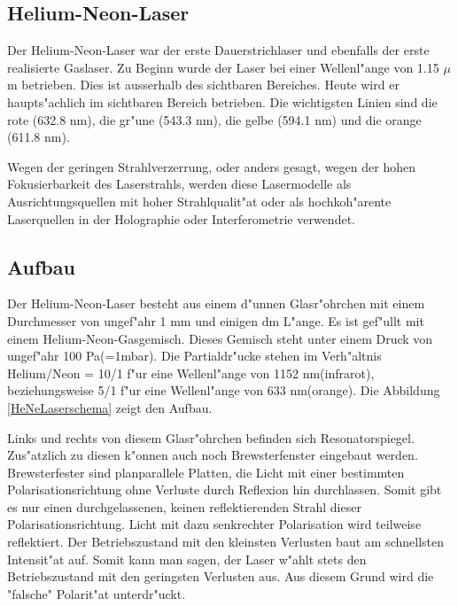 \begin{refsection}


\section{Helium-Neon-Laser
\label{He-Ne-Laser}}
Der Helium-Neon-Laser war der erste Dauerstrichlaser und ebenfalls der erste 
realisierte Gaslaser. Zu Beginn wurde der Laser bei einer Wellenl"ange von 
1.15 $\mu$m betrieben. Dies ist ausserhalb des sichtbaren Bereiches. Heute wird 
er haupts"achlich im sichtbaren Bereich betrieben. Die wichtigsten Linien sind 
die rote (632.8 nm), die gr"une (543.3 nm), die gelbe (594.1 nm) und die 
orange (611.8 nm).

Wegen der geringen Strahlverzerrung, oder anders gesagt, wegen der hohen
Fokusierbarkeit des Laserstrahls, werden diese Lasermodelle als
Ausrichtungsquellen mit hoher Strahlqualit"at oder als hochkoh"arente
Laserquellen in der Holographie oder Interferometrie verwendet.

\subsection{Aufbau}
\label{He-Ne-Laser Aufbau}
Der Helium-Neon-Laser besteht aus einem d"unnen Glasr"ohrchen mit einem 
Durchmesser von ungef"ahr 1 mm und einigen dm L"ange. Es ist gef"ullt mit 
einem Helium-Neon-Gasgemisch. 
Dieses Gemisch steht unter einem Druck von ungef"ahr 100 Pa(=1mbar).
Die Partialdr"ucke stehen im Verh"altnis Helium/Neon = 10/1 f"ur eine 
Wellenl"ange von 1152 nm(infrarot),
beziehungsweise 5/1 f"ur eine Wellenl"ange von 633 nm(orange).
Die Abbildung \ref{HeNeLaserschema} zeigt den Aufbau.

Links und rechts von diesem Glasr"ohrchen befinden sich Resonatorspiegel.
Zus"atzlich zu diesen k"onnen auch noch Brewsterfenster eingebaut werden.
Brewsterfester sind planparallele Platten, die Licht mit einer bestimmten 
Polarisationsrichtung ohne Verluste durch Reflexion hin durchlassen. Somit 
gibt es nur einen durchgelassenen, keinen reflektierenden Strahl dieser 
Polarisationsrichtung. Licht mit dazu senkrechter Polarisation wird teilweise 
reflektiert.
Der Betriebszustand mit den kleinsten Verlusten baut am schnellsten Intensit"at
auf. Somit kann man sagen, der Laser w"ahlt stets den Betriebszustand mit den
geringsten Verlusten aus.
Aus diesem Grund wird die "falsche" Polarit"at unterdr"uckt.


\end{refsection}
